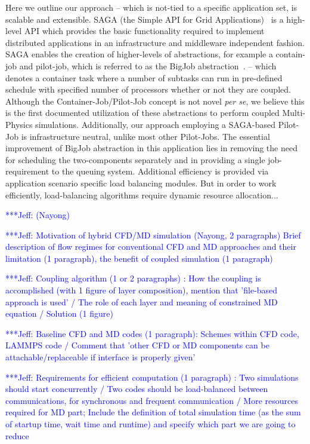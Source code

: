 \documentclass[times, 10pt,twocolumn]{article}
\newcommand{\skonote}[1]{ {\textcolor{blue} { ***Jeff: #1 }}}
\newcommand{\skonote}[1]{}
\begin{document}
Here we outline our approach -- which is not-tied to a specific application set, is scalable and extensible. SAGA (the Simple API for Grid Applications)~\cite{Jha:2008} is a high-level API which provides the basic functionality required to implement distributed applications in an infrastructure and middleware independent fashion.  SAGA enables the creation of higher-levels of abstractions, for example a contain-job and pilot-job, which is referred to as the BigJob abstraction~\cite{Jha:2009}.  -- which denotes a container task where a number of subtasks can run in pre-defined schedule with specified number of processors whether or not they are coupled.  Although the Container-Job/Pilot-Job concept is not novel {\it per se}, we believe this is the first documented utilization of these abstractions to perform coupled Multi-Physics simulations. Additionally, our approach employing a SAGA-based Pilot-Job is infrastructure neutral, unlike most other Pilot-Jobs.  The essential improvement of BigJob abstraction in this application lies in removing the need for scheduling the two-components separately and in providing a single job-requirement to the queuing system. Additional efficiency is provided via application scenario specific load balancing modules. But in order to work efficiently, load-balancing algorithms require dynamic resource allocation...

\skonote{(Nayong)}

\skonote{Motivation of hybrid CFD/MD simulation (Nayong, 2 paragraphs)
Brief description of flow regimes for conventional CFD and MD approaches and their limitation (1 paragraph), the benefit of coupled simulation (1 paragraph)}

\skonote{Coupling algorithm (1 or 2 paragraphs)
: How the coupling is accomplished (with 1 figure of layer composition), mention that 'file-based approach is used' / The role of each layer and meaning of constrained MD equation / Solution (1 figure)}

\skonote{Baseline CFD and MD codes (1 paragraph): Schemes within CFD code, LAMMPS code / Comment that 'other CFD or MD components can be attachable/replaceable if interface is properly given'}

\skonote{Requirements for efficient computation (1 paragraph)
: Two simulations should start concurrently / Two codes should be load-balanced between communications, for synchronous and frequent communication / More resources required for MD part; Include the definition of total simulation time (as the sum of startup time, wait time and runtime) and specify which part we are going to reduce}
\end{document}
